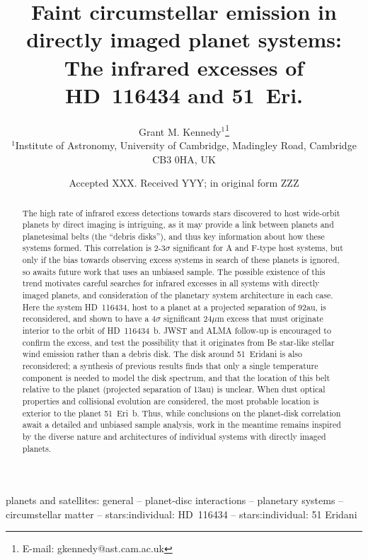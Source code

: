 \documentclass[a4paper,fleqn,usenatbib]{mnras}
\title[Infrared excesses of HD~116434 and 51 Eri]{Faint circumstellar
  emission in directly imaged planet systems: \\ The infrared excesses
  of HD~116434 and 51~Eri.}
\author[G. M Kennedy]{
Grant M. Kennedy$^{1}$\thanks{E-mail: gkennedy@ast.cam.ac.uk}
\\
$^{1}$Institute of Astronomy, University of Cambridge, Madingley Road, Cambridge CB3
  0HA, UK 
}
\date{Accepted XXX. Received YYY; in original form ZZZ}
\begin{document}
\label{firstpage}
\pagerange{\pageref{firstpage}--\pageref{lastpage}}
\maketitle

\begin{abstract}
  The high rate of infrared excess detections towards stars discovered
  to host wide-orbit planets by direct imaging is intriguing, as it may
  provide a link between planets and planetesimal belts (the ``debris
  disks''), and thus key information about how these systems
  formed. This correlation is 2-3$\sigma$ significant for A and F-type
  host systems, but only if the bias towards observing excess systems in
  search of these planets is ignored, so awaits future work that uses an
  unbiased sample.  The possible existence of this trend motivates
  careful searches for infrared excesses in all systems with directly
  imaged planets, and consideration of the planetary system architecture
  in each case. Here the system HD~116434, host to a planet at a
  projected separation of 92au, is reconsidered, and shown to have a
  4$\sigma$ significant 24$\mu$m excess that must originate interior to
  the orbit of HD~116434~b. JWST and ALMA follow-up is encouraged to
  confirm the excess, and test the possibility that it originates from
  Be star-like stellar wind emission rather than a debris disk. The disk
  around 51~Eridani is also reconsidered; a synthesis of previous
  results finds that only a single temperature component is needed to
  model the disk spectrum, and that the location of this belt relative
  to the planet (projected separation of 13au) is unclear. When dust
  optical properties and collisional evolution are considered, the most
  probable location is exterior to the planet 51~Eri~b. Thus, while
  conclusions on the planet-disk correlation await a detailed and
  unbiased sample analysis, work in the meantime remains inspired by the
  diverse nature and architectures of individual systems with directly
  imaged planets.
\end{abstract}

\begin{keywords}
  planets and satellites: general -- planet-disc interactions --
  planetary systems -- circumstellar matter -- stars:individual:
  HD~116434 -- stars:individual: 51 Eridani
\end{keywords}
\end{document}
